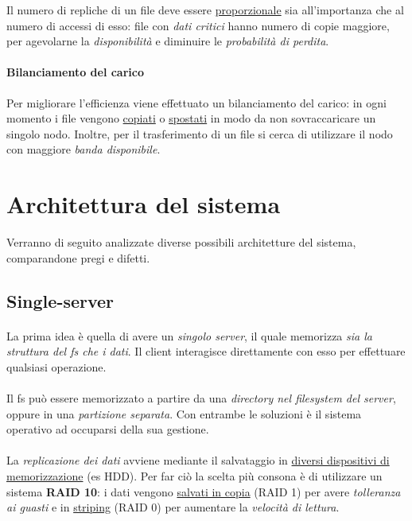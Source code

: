 \documentclass{article}
\begin{document}
Il numero di repliche di un file deve essere \underline{proporzionale} sia all'importanza che al numero di accessi di esso: file con \emph{dati critici} hanno numero di copie maggiore, per agevolarne la \emph{disponibilità} e diminuire le \emph{probabilità di perdita}. 


\paragraph{Bilanciamento del carico} Per migliorare l'efficienza viene effettuato un bilanciamento del carico: in ogni momento i file vengono \underline{copiati} o \underline{spostati} in modo da non sovraccaricare un singolo nodo. Inoltre, per il trasferimento di un file si cerca di utilizzare il nodo con maggiore \emph{banda disponibile}. 



\section{Architettura del sistema}

Verranno di seguito analizzate diverse possibili architetture del sistema, comparandone pregi e difetti. 

\subsection{Single-server}

\paragraph{} La prima idea è quella di avere un \emph{singolo server}, il quale memorizza \emph{sia la struttura del fs che i dati}. Il client interagisce direttamente con esso per effettuare qualsiasi operazione. 

\paragraph{} Il fs può essere memorizzato a partire da una \emph{directory nel filesystem del server}, oppure in una \emph{partizione separata}. Con entrambe le soluzioni è il sistema operativo ad occuparsi della sua gestione.

\paragraph{} La \emph{replicazione dei dati} avviene mediante il salvataggio in \underline{diversi dispositivi di memorizzazione} (es HDD). Per far ciò la scelta più consona è di utilizzare un sistema \textbf{RAID 10}: i dati vengono \underline{salvati in copia} (RAID 1) per avere \emph{tolleranza ai guasti} e in \underline{striping} (RAID 0) per aumentare la \emph{velocità di lettura}. 
\end{document}
